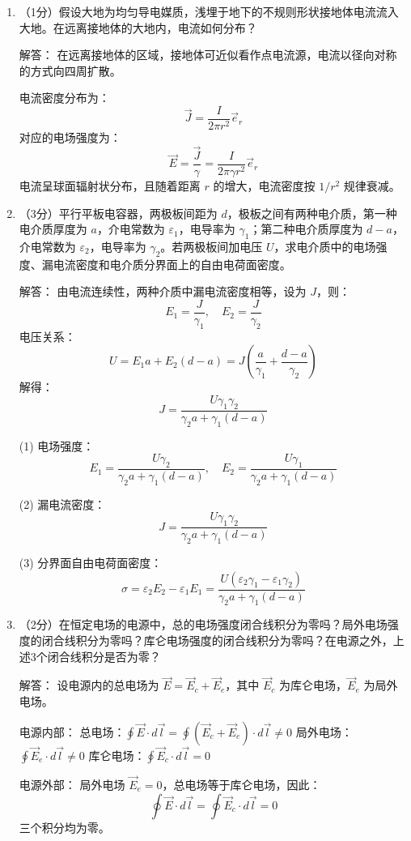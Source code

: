 \begin{enumerate}
\item （1分）假设大地为均匀导电媒质，浅埋于地下的不规则形状接地体电流流入大地。在远离接地体的大地内，电流如何分布？

解答：
在远离接地体的区域，接地体可近似看作点电流源，电流以径向对称的方式向四周扩散。

电流密度分布为：
\[
\vec{J} = \frac{I}{2\pi r^2}\vec{e}_r
\]
对应的电场强度为：
\[
\vec{E} = \frac{\vec{J}}{\gamma} = \frac{I}{2\pi\gamma r^2}\vec{e}_r
\]
电流呈球面辐射状分布，且随着距离 $r$ 的增大，电流密度按 $1/r^2$ 规律衰减。

\item （3分）平行平板电容器，两极板间距为 $d$，极板之间有两种电介质，第一种电介质厚度为 $a$，介电常数为 $\varepsilon_1$，电导率为 $\gamma_1$；第二种电介质厚度为 $d-a$，介电常数为 $\varepsilon_2$，电导率为 $\gamma_2$。若两极板间加电压 $U$，求电介质中的电场强度、漏电流密度和电介质分界面上的自由电荷面密度。

解答：
由电流连续性，两种介质中漏电流密度相等，设为 $J$，则：
\[
E_1 = \frac{J}{\gamma_1},\quad E_2 = \frac{J}{\gamma_2}
\]
电压关系：
\[
U = E_1 a + E_2 (d-a) = J\left(\frac{a}{\gamma_1}+\frac{d-a}{\gamma_2}\right)
\]
解得：
\[
J = \frac{U\gamma_1\gamma_2}{\gamma_2 a + \gamma_1(d-a)}
\]

(1) 电场强度：
\[
E_1 = \frac{U\gamma_2}{\gamma_2 a + \gamma_1(d-a)},\quad E_2 = \frac{U\gamma_1}{\gamma_2 a + \gamma_1(d-a)}
\]

(2) 漏电流密度：
\[
J = \frac{U\gamma_1\gamma_2}{\gamma_2 a + \gamma_1(d-a)}
\]

(3) 分界面自由电荷面密度：
\[
\sigma = \varepsilon_2 E_2 - \varepsilon_1 E_1 = \frac{U(\varepsilon_2\gamma_1-\varepsilon_1\gamma_2)}{\gamma_2 a + \gamma_1(d-a)}
\]

\item （2分）在恒定电场的电源中，总的电场强度闭合线积分为零吗？局外电场强度的闭合线积分为零吗？库仑电场强度的闭合线积分为零吗？在电源之外，上述3个闭合线积分是否为零？

解答：
设电源内的总电场为 $\vec{E}=\vec{E}_c+\vec{E}_e$，其中 $\vec{E}_c$ 为库仑电场，$\vec{E}_e$ 为局外电场。

电源内部：
总电场：$\oint \vec{E}\cdot d\vec{l} = \oint (\vec{E}_c+\vec{E}_e)\cdot d\vec{l} \neq 0$
局外电场：$\oint \vec{E}_e\cdot d\vec{l} \neq 0$
库仑电场：$\oint \vec{E}_c\cdot d\vec{l} = 0$

电源外部：
局外电场 $\vec{E}_e=0$，总电场等于库仑电场，因此：
\[
\oint \vec{E}\cdot d\vec{l} = \oint \vec{E}_c\cdot d\vec{l} = 0
\]
三个积分均为零。


\end{enumerate}
